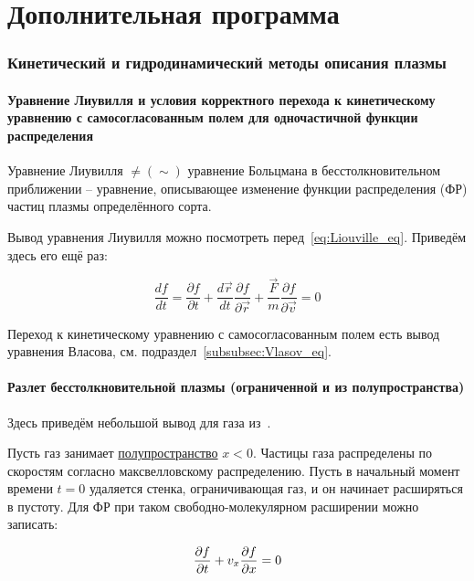 \documentclass[10pt, a4paper]{article}
\let\stdsection\section
\renewcommand\section{\newpage\stdsection}
\let\stdpart\part
\renewcommand{\part}{\newpage\stdpart}
\begin{document}
\part{Дополнительная программа}

\section{Кинетический и гидродинамический методы описания плазмы}

\subsection{Уравнение Лиувилля и условия корректного перехода к кинетическому уравнению с самосогласованным полем для одночастичной функции распределения}

Уравнение Лиувилля $\neq (\sim)$ уравнение Больцмана в бесстолкновительном приближении -- уравнение, описывающее изменение функции распределения (ФР) частиц плазмы определённого сорта.

Вывод уравнения Лиувилля можно посмотреть перед~\eqref{eq:Liouville_eq}. Приведём здесь его ещё раз:

\begin{equation}
	\frac{df}{dt} = \frac{\partial f}{\partial t} + \frac{d\vec{r}}{dt}\frac{\partial f}{\partial \vec{r}}+ \frac{\vec{F}}{m}\frac{\partial f}{\partial \vec{v}} = 0
\end{equation}

Переход к кинетическому уравнению с самосогласованным полем есть вывод уравнения Власова, см. подраздел~\ref{subsubsec:Vlasov_eq}.

\subsection{Разлет бесстолкновительной плазмы (ограниченной и из полупространства)}

Здесь приведём небольшой вывод для газа из~\cite{silin}. 

Пусть газ занимает \uline{полупространство} $x<0$. Частицы газа распределены по скоростям согласно максвелловскому распределению. Пусть в начальный момент времени $t=0$ удаляется стенка, ограничивающая газ, и он начинает расширяться в пустоту. Для ФР при таком свободно-молекулярном расширении можно записать:

\begin{equation*}
	\pdv{f}{t}+v_x\pdv{f}{x} = 0
\end{equation*}
\end{document}
